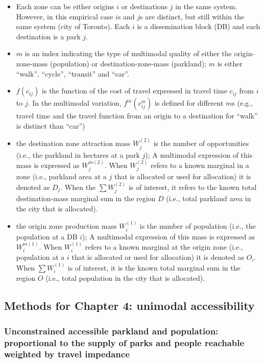 \documentclass[
11pt, %
oneside, %
english, %
singlespacing, %
]{macthesis} %
\def\tightlist{}
\begin{document}
\begin{itemize}
\tightlist
\item
  Each zone can be either origins \(i\) or destinations \(j\) in the same system. However, in this empirical case \(i\)s and \(j\)s are distinct, but still within the same system (city of Toronto). Each \(i\) is a dissemination block (DB) and each destination is a park \(j\).
\item
  \(m\) is an index indicating the type of multimodal quality of either the origin-zone-mass (population) or destination-zone-mass (parkland); \(m\) is either ``walk'', ``cycle'', ``transit'' and ``car''.
\item
  \(f(c_{ij})\) is the function of the cost of travel expressed in travel time \(c_{ij}\) from \(i\) to \(j\). In the multimodal variation, \(f^m(c^m_{ij})\) is defined for different \(m\)s (e.g., travel time and the travel function from an origin to a destination for ``walk'' is distinct than ``car'')
\item
  the destination zone attraction mass \(W_j^{(2)}\) is the number of opportunities (i.e., the parkland in hectares at a park \(j\)); A multimodal expression of this mass is expressed as \(W_j^{m(2)}\). When \(W_j^{(2)}\) refers to a known marginal in a zone (i.e., parkland area at a \(j\) that is allocated or used for allocation) it is denoted as \(D_j\). When the \(\sum W_j^{(2)}\) is of interest, it refers to the known total destination-mass marginal sum in the region \(D\) (i.e., total parkland area in the city that is allocated).
\item
  the origin zone production mass \(W_i^{(1)}\) is the number of population (i.e., the population at a DB \(i\)); A multimodal expression of this mass is expressed as \(W_i^{m(1)}\). When \(W_i^{(1)}\) refers to a known marginal at the origin zone (i.e., population at a \(i\) that is allocated or used for allocation) it is denoted as \(O_i\). When \(\sum W_i^{(1)}\) is of interest, it is the known total marginal sum in the region \(O\) (i.e., total population in the city that is allocated).
\end{itemize}

\subsection{Methods for Chapter 4: unimodal accessibility}\label{methods-for-chapter-4-unimodal-accessibility}

\subsubsection{Unconstrained accessible parkland and population: proportional to the supply of parks and people reachable weighted by travel impedance}\label{unconstrained-accessible-parkland-and-population-proportional-to-the-supply-of-parks-and-people-reachable-weighted-by-travel-impedance}
\end{document}
